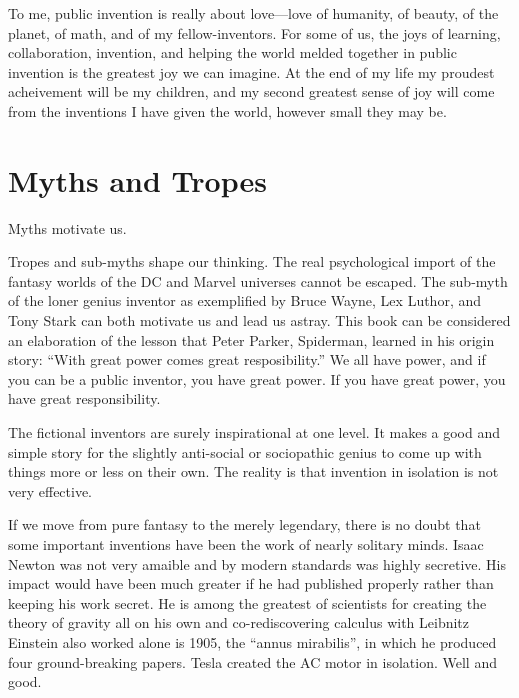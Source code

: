 \documentclass[
	fontsize=10pt, %
	twoside=false, %
	secnumdepth=1, %
]{kaobook}
\begin{document}
To me, public invention is really about love---love of humanity,
of beauty, of the planet, of math, and of my fellow-inventors.
For some of us, the joys of learning, collaboration, invention,
and helping the world melded together in public invention
is the greatest joy we can imagine.
At the end of my life my proudest acheivement will be my children,
and my second greatest sense of joy will come from the
inventions I have given the world, however small they may be.


\section{Myths and Tropes}

Myths motivate us.

Tropes and sub-myths shape our thinking.
The real psychological import of the fantasy worlds of the DC and Marvel universes cannot be escaped.
The sub-myth of the loner genius inventor as exemplified by Bruce Wayne, Lex Luthor, and Tony Stark
can both motivate us and lead us astray.
This book can be considered an elaboration of the lesson that Peter Parker, Spiderman, learned
in his origin story: ``With great power comes great resposibility.''
We all have power, and if you can be a public inventor, you have great power. If you have great power, you have great responsibility.

The fictional inventors are surely inspirational at one level.
It makes a good and simple story for the slightly anti-social or sociopathic genius to come up with things more or less on their own.
The reality is that invention in isolation is not very effective.

If we move from pure fantasy to the merely legendary, there is no doubt that
some important inventions have been the work of nearly solitary minds.
Isaac Newton was not very amaible and by modern standards was highly secretive.
His impact would have been much greater if he had published properly rather than keeping his work secret.
He is among the greatest of scientists for creating the theory of gravity
all on his own and co-rediscovering calculus with Leibnitz
Einstein also worked alone is 1905, the ``annus mirabilis'', in which he produced four ground-breaking papers.
Tesla created the AC motor in isolation. Well and good.
\end{document}
